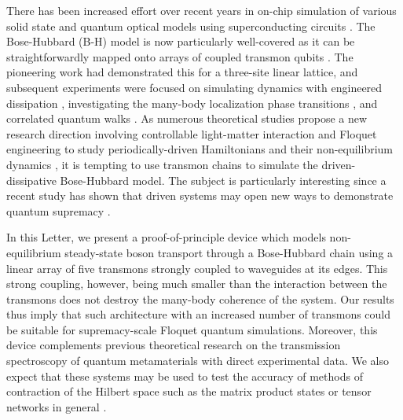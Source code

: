 \documentclass[%
 aps, prl,
 amsmath,amssymb,
 reprint,%
superscriptaddress
]{revtex4-2}
\begin{document}
\maketitle



There has been increased effort over recent years in on-chip simulation of various solid state and quantum optical models using superconducting circuits \cite{kjaergaard2019superconducting}. The Bose-Hubbard (B-H) model is now particularly well-covered as it can be straightforwardly mapped onto arrays of coupled transmon qubits \cite{orell2019probing,yanay2020two}. The pioneering work \cite{hacohen2015cooling} had demonstrated this for a three-site linear lattice, and subsequent experiments were focused on simulating dynamics with engineered dissipation \cite{ma2019dissipatively}, investigating the many-body localization phase transitions \cite{roushan2017spectroscopic,chiaro2019growth}, and correlated quantum walks \cite{Yan2019, Ye2019}. As numerous theoretical studies propose a new research direction involving controllable light-matter interaction and Floquet engineering to study periodically-driven Hamiltonians and their non-equilibrium dynamics \cite{Goldman2014, eisert2015quantum, Zippilli2015, kyriienko2018floquet, franca2020simulating}, it is tempting to use transmon chains  to simulate the driven-dissipative Bose-Hubbard model. The subject is particularly interesting since a recent study has shown that driven systems may open new ways to demonstrate quantum supremacy \cite{tangpanitanon2019quantum}.

In this Letter, we present a proof-of-principle device which models non-equilibrium steady-state boson transport through a Bose-Hubbard chain using a linear array of five transmons strongly coupled to waveguides at its edges. This strong coupling, however, being much smaller than the interaction between the transmons does not destroy the many-body coherence of the system. Our results thus imply that such architecture with an increased number of transmons could be suitable for supremacy-scale Floquet quantum simulations. Moreover, this device complements previous theoretical research on the transmission spectroscopy of quantum metamaterials \cite{Zagoskin2016, viehmann2013observing, Greenberg2015, Fistul2019, Biella2015,roberts2020driven, collodo2019observation} with direct experimental data. We also expect that these systems may be used to test the accuracy of methods of contraction of the Hilbert space such as the matrix product states or tensor networks in general \cite{Biella2015, orell2019probing, di2019efficient}.
\end{document}
